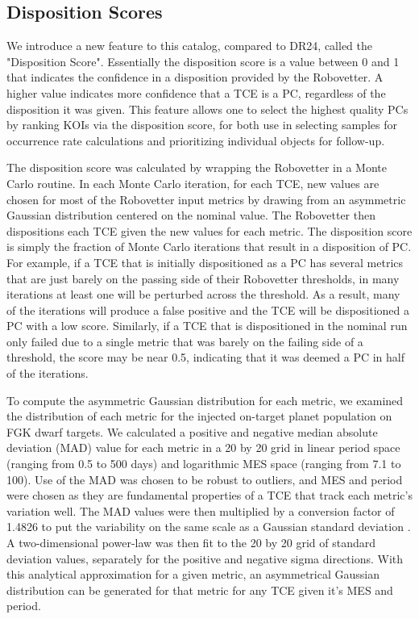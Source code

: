 

\subsection{Disposition Scores}
\label{s:scores}
We introduce a new feature to this catalog, compared to DR24, called the "Disposition Score". Essentially the disposition score is a value between 0 and 1 that indicates the confidence in a disposition provided by the Robovetter. A higher value indicates more confidence that a TCE is a PC, regardless of the disposition it was given. This feature allows one to select the highest quality PCs by ranking KOIs via the disposition score, for both use in selecting samples for occurrence rate calculations and prioritizing individual objects for follow-up.

The disposition score was calculated by wrapping the Robovetter in a Monte Carlo routine. In each Monte Carlo iteration, for each TCE, new values are chosen for most of the Robovetter input metrics by drawing from an asymmetric Gaussian distribution centered on the nominal value. The Robovetter then dispositions each TCE given the new values for each metric. The disposition score is simply the fraction of Monte Carlo iterations that result in a disposition of PC. For example, if a TCE that is initially dispositioned as a PC has several metrics that are just barely on the passing side of their Robovetter thresholds, in many iterations at least one will be perturbed across the threshold. As a result, many of the iterations will produce a false positive and the TCE will be dispositioned a PC with a low score.  Similarly, if a TCE that is dispositioned in the nominal run only failed due to a single metric that was barely on the failing side of a threshold, the score may be near 0.5, indicating that it was deemed a PC in half of the iterations.

To compute the asymmetric Gaussian distribution for each metric, we examined the distribution of each metric for the injected on-target planet population on FGK dwarf targets. We calculated a positive and negative median absolute deviation (MAD) value for each metric in a 20 by 20 grid in linear period space (ranging from 0.5 to 500 days) and logarithmic MES space (ranging from 7.1 to 100). Use of the MAD was chosen to be robust to outliers, and MES and period were chosen as they are fundamental properties of a TCE that track each metric's variation well. The MAD values were then multiplied by a conversion factor of 1.4826 to put the variability on the same scale as a Gaussian standard deviation \citep{Hampel1974,Ruppert2010}. A two-dimensional power-law was then fit to the 20 by 20 grid of standard deviation values, separately for the positive and negative sigma directions. With this analytical approximation for a given metric, an asymmetrical Gaussian distribution can be generated for that metric for any TCE given it's MES and period.

